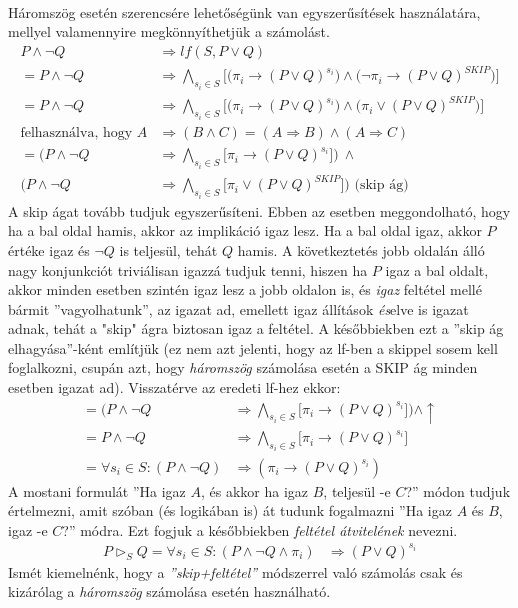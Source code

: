 \documentclass[12pt]{article}
\begin{document}
\paragraph{}Háromszög esetén szerencsére lehetőségünk van egyszerűsítések használatára, mellyel valamennyire megkönnyíthetjük a számolást.
\begin{align*}
    P \land \neg Q &\Rightarrow lf(S,P \lor Q) \\
    = P \land \neg Q &\Rightarrow \bigwedge_{s_i \in S} \big[\big(\pi_i \rightarrow (P \lor Q)^{s_i}\big) \land \big(\neg \pi_i \rightarrow (P \lor Q)^{SKIP}\big)\big] \\
    = P \land \neg Q &\Rightarrow \bigwedge_{s_i \in S} \big[\big(\pi_i \rightarrow (P \lor Q)^{s_i}\big) \land \big(\pi_i \lor (P \lor Q)^{SKIP}\big)\big] \\
    \text{felhasználva, hogy } A &\Rightarrow (B \land C) = (A \Rightarrow B) \land (A \Rightarrow C) \\
    = \big(P \land \neg Q &\Rightarrow \bigwedge_{s_i \in S}  \big[\pi_i \rightarrow (P \lor Q)^{s_i}\big]\big)\ \land \\
    \big(P \land \neg Q &\Rightarrow \bigwedge_{s_i \in S} \big[\pi_i \lor (P \lor Q)^{SKIP}\big]\big) \text{ (skip ág)}
\end{align*}
A skip ágat tovább tudjuk egyszerűsíteni.
Ebben az esetben meggondolható, hogy ha a bal oldal hamis, akkor az implikáció igaz lesz. Ha a bal oldal igaz, akkor $P$ értéke igaz és $\neg Q$ is teljesül, tehát $Q$ hamis. A következtetés jobb oldalán álló nagy konjunkciót triviálisan igazzá tudjuk tenni, hiszen ha $P$ igaz a bal oldalt, akkor  minden esetben szintén igaz lesz a jobb oldalon is, és \textit{igaz} feltétel mellé bármit ''vagyolhatunk'', az igazat ad, emellett igaz állítások \textit{és}elve is igazat adnak, tehát a "skip" ágra biztosan igaz a feltétel. A későbbiekben ezt a ''skip ág elhagyása''-ként említjük (ez nem azt jelenti, hogy az lf-ben a skippel sosem kell foglalkozni, csupán azt, hogy \textit{háromszög} számolása esetén a SKIP ág minden esetben igazat ad). Visszatérve az eredeti lf-hez ekkor:
\begin{align*}
    = \big(P \land \neg Q &\Rightarrow \bigwedge_{s_i \in S} \big[\pi_i \rightarrow (P \lor Q)^{s_i}\big]\big) \land \uparrow \\
    = P \land \neg Q &\Rightarrow \bigwedge_{s_i \in S} \big[\pi_i \rightarrow (P \lor Q)^{s_i}\big] \\
    = \forall s_i \in S: (P \land \neg Q) &\Rightarrow (\pi_i \rightarrow (P \lor Q)^{s_i})
\end{align*}
A mostani formulát ''Ha igaz $A$, és akkor ha igaz $B$, teljesül -e $C$?'' módon tudjuk értelmezni, amit szóban (és logikában is) át tudunk fogalmazni ''Ha igaz $A$ és $B$, igaz -e $C$?'' módra. Ezt fogjuk a későbbiekben \textit{feltétel átvitelének} nevezni.
\begin{align*}
    P \vartriangleright_S Q = \forall s_i \in S: (P \land \neg Q \land \pi_i) &\Rightarrow (P \lor Q)^{s_i}
\end{align*}
Ismét kiemelnénk, hogy a \textit{''skip+feltétel''} módszerrel való számolás csak és kizárólag a \textit{háromszög} számolása esetén használható.
\end{document}
